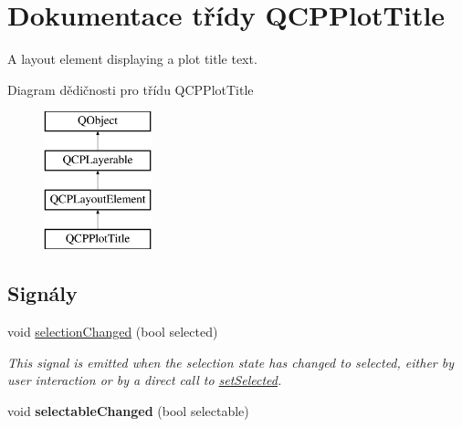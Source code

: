 \hypertarget{classQCPPlotTitle}{}\section{Dokumentace třídy Q\+C\+P\+Plot\+Title}
\label{classQCPPlotTitle}


A layout element displaying a plot title text.  


Diagram dědičnosti pro třídu Q\+C\+P\+Plot\+Title\begin{figure}[H]
\begin{center}
\leavevmode
\includegraphics[height=4.000000cm]{classQCPPlotTitle}
\end{center}
\end{figure}
\subsection*{Signály}
\begin{DoxyCompactItemize}
\item 
void \hyperlink{classQCPPlotTitle_a3a01ede2da3b0b5eda33aa5274cc3523}{selection\+Changed} (bool selected)
\begin{DoxyCompactList}\small\item\em This signal is emitted when the selection state has changed to {\itshape selected}, either by user interaction or by a direct call to \hyperlink{classQCPPlotTitle_a8d441a889d371307df86f1ab7687a333}{set\+Selected}. \end{DoxyCompactList}\item 
\hypertarget{classQCPPlotTitle_a5eac3c17a4dbabb75250bc1210a83cfc}{}void {\bfseries selectable\+Changed} (bool selectable)\label{classQCPPlotTitle_a5eac3c17a4dbabb75250bc1210a83cfc}

\end{DoxyCompactItemize}
